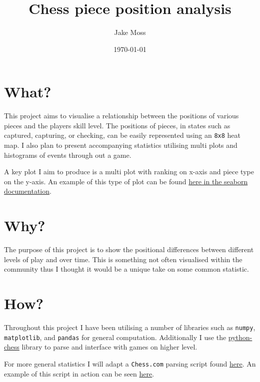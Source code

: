 \documentclass[11pt]{article}
\author{Jake Moss}
\date{\today}
\title{Chess piece position analysis}
\begin{document}
\maketitle

\section{What?}
\label{sec:org2d752c1}
This project aims to visualise a relationship between the positions of various
pieces and the players skill level. The positions of pieces, in states such as
captured, capturing, or checking, can be easily represented using an \texttt{8x8} heat
map. I also plan to present accompanying statistics utilising multi plots and
histograms of events through out a game.

A key plot I aim to produce is a multi plot with ranking on x-axis and piece
type on the y-axis. An example of this type of plot can be found \href{https://seaborn.pydata.org/\_images/axis\_grids\_18\_0.png}{here in the seaborn documentation}.

\section{Why?}
\label{sec:org3528091}
The purpose of this project is to show the positional differences between
different levels of play and over time. This is something not often visualised
within the community thus I thought it would be a unique take on some common
statistic.

\section{How?}
\label{sec:org54c9ee6}
Throughout this project I have been utilising a number of libraries such as
\texttt{numpy}, \texttt{matplotlib}, and \texttt{pandas} for general computation. Additionally I use
the \href{https://github.com/niklasf/python-chess}{python-chess} library to parse and interface with games on higher level.

For more general statistics I will adapt a \texttt{Chess.com} parsing script found
\href{https://public.tableau.com/views/MyChessJourney-Visualized/MyChessJourney?:language=en\&:display\_count=y\&publish=yes\&:origin=viz\_share\_link\&:showVizHome=no}{here}. An example of this script in action can be seen \href{https://public.tableau.com/views/MyChessJourney-Visualized/MyChessJourney?:language=en\&:display\_count=y\&publish=yes\&:origin=viz\_share\_link\&:showVizHome=no}{here}.
\end{document}
